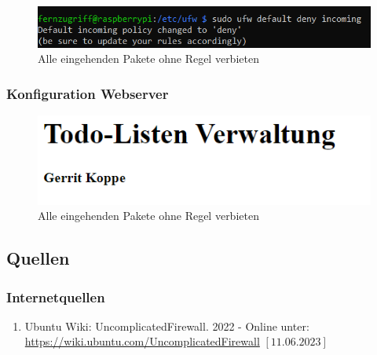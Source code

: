 \documentclass[a4paper, 11pt]{scrartcl}
\begin{document}
\begin{figure}[H]
    \begin{center}
        \includegraphics[scale=0.7]{Bilder/ufw_deny_all_incoming.png}
        \caption{Alle eingehenden Pakete ohne Regel verbieten}\label{pic:firewall_deny_default}
    \end{center}
\end{figure}

\subsubsection{Konfiguration Webserver}\label{ch:pics_webserver}
\begin{figure}[H]
    \begin{center}
        \includegraphics[scale=0.7]{Bilder/apache_simple_start_page.png}
        \caption{Alle eingehenden Pakete ohne Regel verbieten}\label{pic:apache_simple_page}
    \end{center}
\end{figure}





\subsection{Quellen}\label{ch:src}
\subsubsection{Internetquellen}\label{ch:src_internet}
\begin{enumerate}
    \item Ubuntu Wiki: UncomplicatedFirewall. 2022 - Online unter: \newline\url{https://wiki.ubuntu.com/UncomplicatedFirewall} $\left[\text{11.06.2023}\right]$\label{src:ufw}
\end{enumerate}
\begin{small}

\end{small}
\end{document}
